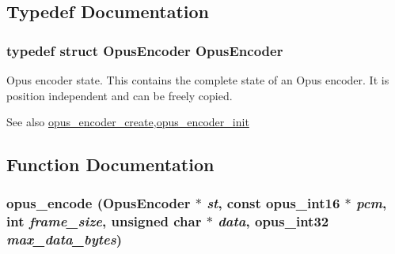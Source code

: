 \subsection{Typedef Documentation}
\hypertarget{group__opus__encoder_gaf461a3ef2f10c2fe8b994a176f06c9bd}{
\subsubsection[{OpusEncoder}]{\setlength{\rightskip}{0pt plus 5cm}typedef struct {\bf OpusEncoder} {\bf OpusEncoder}}}
\label{group__opus__encoder_gaf461a3ef2f10c2fe8b994a176f06c9bd}


Opus encoder state. This contains the complete state of an Opus encoder. It is position independent and can be freely copied. \begin{DoxySeeAlso}{See also}
\hyperlink{group__opus__encoder_gaa89264fd93c9da70362a0c9b96b9ca88}{opus\_\-encoder\_\-create},\hyperlink{group__opus__encoder_ga515db1c267a7421dacaad3610f79eb79}{opus\_\-encoder\_\-init} 
\end{DoxySeeAlso}


\subsection{Function Documentation}
\hypertarget{group__opus__encoder_gad2d6bf6a9ffb6674879d7605ed073e25}{
\subsubsection[{opus\_\-encode}]{ opus\_\-encode ({\bf OpusEncoder} $\ast$ {\em st}, \/  const {\bf opus\_\-int16} $\ast$ {\em pcm}, \/  int {\em frame\_\-size}, \/  unsigned char $\ast$ {\em data}, \/  {\bf opus\_\-int32} {\em max\_\-data\_\-bytes})}}
\label{group__opus__encoder_gad2d6bf6a9ffb6674879d7605ed073e25}


